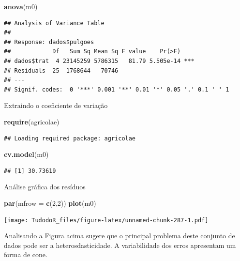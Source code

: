 \documentclass[
]{book}
\newenvironment{Shaded}{\begin{snugshade}}{\end{snugshade}}
\newcommand{\DataTypeTok}[1]{\textcolor[rgb]{0.13,0.29,0.53}{#1}}
\newcommand{\DecValTok}[1]{\textcolor[rgb]{0.00,0.00,0.81}{#1}}
\newcommand{\KeywordTok}[1]{\textcolor[rgb]{0.13,0.29,0.53}{\textbf{#1}}}
\newcommand{\NormalTok}[1]{#1}
\begin{document}
\begin{Shaded}
\begin{Highlighting}[]
\KeywordTok{anova}\NormalTok{(m0)}
\end{Highlighting}
\end{Shaded}

\begin{verbatim}
## Analysis of Variance Table
## 
## Response: dados$pulgoes
##            Df   Sum Sq Mean Sq F value    Pr(>F)    
## dados$trat  4 23145259 5786315   81.79 5.505e-14 ***
## Residuals  25  1768644   70746                      
## ---
## Signif. codes:  0 '***' 0.001 '**' 0.01 '*' 0.05 '.' 0.1 ' ' 1
\end{verbatim}

Extraindo o coeficiente de variação

\begin{Shaded}
\begin{Highlighting}[]
\KeywordTok{require}\NormalTok{(agricolae)}
\end{Highlighting}
\end{Shaded}

\begin{verbatim}
## Loading required package: agricolae
\end{verbatim}

\begin{Shaded}
\begin{Highlighting}[]
\KeywordTok{cv.model}\NormalTok{(m0)}
\end{Highlighting}
\end{Shaded}

\begin{verbatim}
## [1] 30.73619
\end{verbatim}

Análise gráfica dos resíduos

\begin{Shaded}
\begin{Highlighting}[]
\KeywordTok{par}\NormalTok{(}\DataTypeTok{mfrow =} \KeywordTok{c}\NormalTok{(}\DecValTok{2}\NormalTok{,}\DecValTok{2}\NormalTok{))}
\KeywordTok{plot}\NormalTok{(m0)}
\end{Highlighting}
\end{Shaded}

\texttt{[image: TudodoR\_files/figure-latex/unnamed-chunk-287-1.pdf]}

Analisando a Figura acima sugere que o principal problema deste conjunto de dados pode ser a heterosdasticidade. A variabilidade dos erros apresentam um forma de cone.
\end{document}
